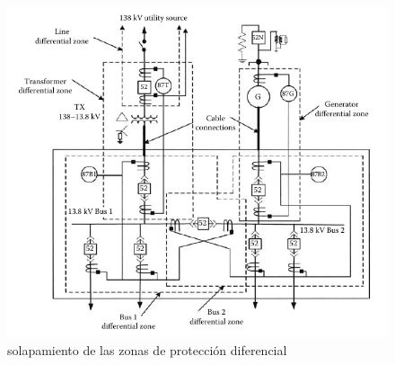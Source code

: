 \documentclass[a5paper]{book}%
\begin{document}
    \begin{figure}[H]
      \centering
      \includegraphics[width=\linewidth]{diferencial_tranformador}
      \caption{solapamiento de las zonas de protección diferencial}
      \label{fig:zonas_diferencial}
    \end{figure}
    
\end{document}
